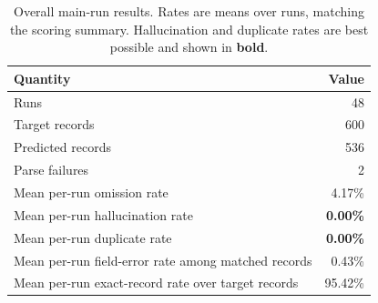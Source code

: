 \begin{table}[t]
    \centering
    \begin{tabular}{@{}lr@{}}
        \toprule
        \textbf{Quantity} & \textbf{Value} \\
        \midrule
        Runs & 48 \\
        Target records & 600 \\
        Predicted records & 536 \\
        Parse failures & 2 \\
        Mean per-run omission rate & 4.17\% \\
        Mean per-run hallucination rate & {\bf 0.00\%} \\
        Mean per-run duplicate rate & {\bf 0.00\%} \\
        Mean per-run field-error rate among matched records & 0.43\% \\
        Mean per-run exact-record rate over target records & 95.42\% \\
        \bottomrule
    \end{tabular}
    \caption{Overall main-run results. Rates are means over runs, matching the scoring summary. Hallucination and duplicate rates are best possible and shown in \textbf{bold}.}
    \label{tab:main_summary}
\end{table}
